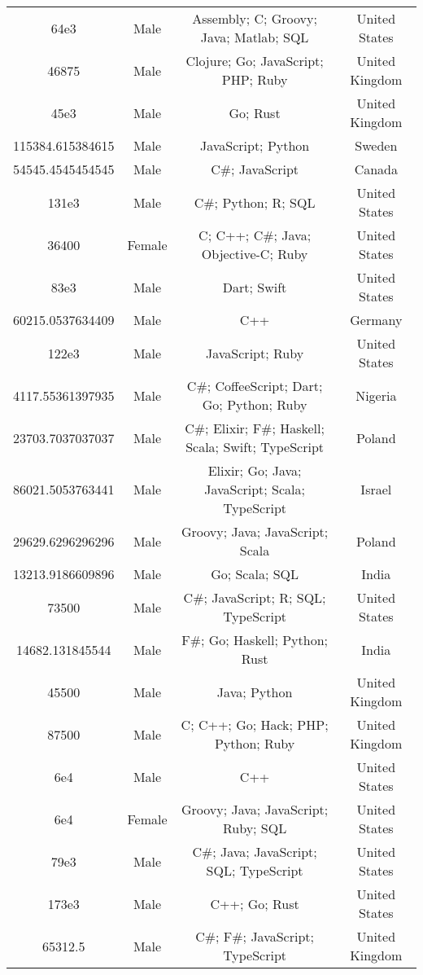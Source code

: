 \begin{center}
\begin{tabular}{ |c|c|c|c| }
64e3  &  Male  &  Assembly; C; Groovy; Java; Matlab; SQL  &  United States  \\ 
46875  &  Male  &  Clojure; Go; JavaScript; PHP; Ruby  &  United Kingdom  \\ 
45e3  &  Male  &  Go; Rust  &  United Kingdom  \\ 
115384.615384615  &  Male  &  JavaScript; Python  &  Sweden  \\ 
54545.4545454545  &  Male  &  C\#; JavaScript  &  Canada  \\ 
131e3  &  Male  &  C\#; Python; R; SQL  &  United States  \\ 
36400  &  Female  &  C; C++; C\#; Java; Objective-C; Ruby  &  United States  \\ 
83e3  &  Male  &  Dart; Swift  &  United States  \\ 
60215.0537634409  &  Male  &  C++  &  Germany  \\ 
122e3  &  Male  &  JavaScript; Ruby  &  United States  \\ 
4117.55361397935  &  Male  &  C\#; CoffeeScript; Dart; Go; Python; Ruby  &  Nigeria  \\ 
23703.7037037037  &  Male  &  C\#; Elixir; F\#; Haskell; Scala; Swift; TypeScript  &  Poland  \\ 
86021.5053763441  &  Male  &  Elixir; Go; Java; JavaScript; Scala; TypeScript  &  Israel  \\ 
29629.6296296296  &  Male  &  Groovy; Java; JavaScript; Scala  &  Poland  \\ 
13213.9186609896  &  Male  &  Go; Scala; SQL  &  India  \\ 
73500  &  Male  &  C\#; JavaScript; R; SQL; TypeScript  &  United States  \\ 
14682.131845544  &  Male  &  F\#; Go; Haskell; Python; Rust  &  India  \\ 
45500  &  Male  &  Java; Python  &  United Kingdom  \\ 
87500  &  Male  &  C; C++; Go; Hack; PHP; Python; Ruby  &  United Kingdom  \\ 
6e4  &  Male  &  C++  &  United States  \\ 
6e4  &  Female  &  Groovy; Java; JavaScript; Ruby; SQL  &  United States  \\ 
79e3  &  Male  &  C\#; Java; JavaScript; SQL; TypeScript  &  United States  \\ 
173e3  &  Male  &  C++; Go; Rust  &  United States  \\ 
65312.5  &  Male  &  C\#; F\#; JavaScript; TypeScript  &  United Kingdom  \\ 

\end{tabular}
\end{center}
